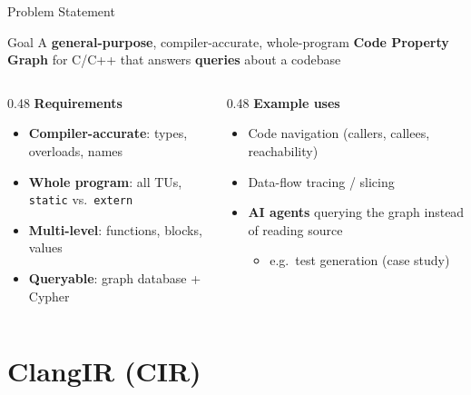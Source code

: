 \documentclass[aspectratio=169,10pt]{beamer}
\newcommand{\code}[1]{\texttt{#1}}
\begin{document}
\begin{frame}{Problem Statement}
  \begin{alertblock}{Goal}
    A \textbf{general-purpose}, compiler-accurate, whole-program
    \textbf{Code Property Graph} for C/C++ that answers \textbf{queries}
    about a codebase
  \end{alertblock}

  \vspace{0.6em}
  \begin{columns}[T]
    \begin{column}{0.48\textwidth}
      \textbf{Requirements}
      \begin{itemize}
        \item \textbf{Compiler-accurate}: types, overloads, names
        \item \textbf{Whole program}: all TUs, \code{static} vs.\ \code{extern}
        \item \textbf{Multi-level}: functions, blocks, values
        \item \textbf{Queryable}: graph database + Cypher
      \end{itemize}
    \end{column}
    \begin{column}{0.48\textwidth}
      \textbf{Example uses}
      \begin{itemize}
        \item Code navigation (callers, callees, reachability)
        \item Data-flow tracing / slicing
        \item \textbf{AI agents} querying the graph instead of reading source
              \begin{itemize}
                \item e.g.\ test generation (case study)
              \end{itemize}
      \end{itemize}
    \end{column}
  \end{columns}
\end{frame}

\section{ClangIR (CIR)}
\end{document}
